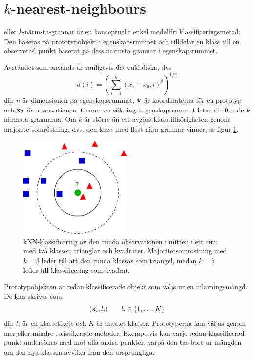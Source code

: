 \documentclass[../rapport_MVEX01-11-05]{subfiles}
\begin{document}
\section{$k$-nearest-neighbours}\label{sec:knn}

\knn eller $k$-närmsta-grannar är en konceptuellt enkel modellfri
klassificeringsmetod.
Den baseras på prototypobjekt i egenskapsrummet och tilldelar en klass
till en observerad punkt baserat på dess närmsta grannar i egenskapsrummet.

Avståndet som används är vanligtvis det euklidiska, dvs
\begin{equation*}
    d(i) = \left(\sum_{i=1}^n(x_i-x_0,i)^2\right)^{1/2}
\end{equation*}
där $n$ är dimensionen på egenskapsrummet, $\mathbf{x}$ är koordinaterna för en
prototyp och $\mathbf{x_0}$ är observationen. Genom en sökning i
egenskapsrummet letar vi efter de $k$ närmsta grannarna. Om $k$ är större än ett
avgörs klasstillhörigheten genom majoritetsomröstning, dvs. den klass med flest
nära grannar vinner, se figur \ref{fig:knn-overview}.

\begin{figure}[!htb]
    \begin{center}
\includegraphics[width=0.5\textwidth]{bilder/KnnClassification}
    \end{center}
    \caption{kNN-klassificering av den runda observationen i mitten i ett rum
    med två klasser, trianglar och kvadrater. Majoritetsomröstning
    med $k=3$ leder till att den runda klassas som triangel, medan $k=5$ leder
    till klassificering som kvadrat.}
    \label{fig:knn-overview}
\end{figure}

Prototypobjekten är redan klassificerade objekt som väljs ur en inlärningsmängd.
De kan skrivas som
\begin{equation*}
    (\mathbf{x}_i, l_i)\qquad l_i \in \{ 1,\dotsc,K \}
\end{equation*}
där $l_i$ är en klassetikett och $K$ är antalet klasser.
Prototyperna kan väljas genom mer eller mindre sofistikerade metoder.
Exempelvis kan varje redan klassificerad punkt undersökas med \knn mot
alla andra punkter, varpå den tas bort ur mängden om den nya klassen avviker
från den ursprungliga.
\end{document}
